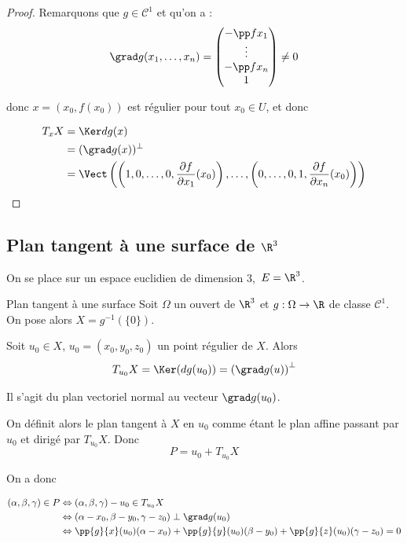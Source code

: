 \begin{proof}
    Remarquons que $g \in \mathscr C^1$ et qu'on a :
    $$\grad g(x_1, \dots, x_n) = \begin{pmatrix}
        - \pp f {x_1} \\
        \vdots \\
        - \pp f {x_n} \\
        1
    \end{pmatrix} \neq 0$$

    donc $x = (x_0, f(x_0))$ est régulier pour tout $x_0 \in U$, et donc 

    \begin{align}
        T_xX & = \Ker dg(x) \\
        & = (\grad g(x))^\perp \\
        & = \Vect \left( \left(1, 0, \ldots, 0, \frac{\partial f}{\partial x_1}(x_0) \right), \ldots, \left(0, \ldots, 0, 1, \frac{\partial f}{\partial x_n}(x_0) \right) \right) 
    \end{align}
\end{proof}


\subsection{Plan tangent à une surface de \texorpdfstring{$\R^3$}{R3}}

On se place sur un espace euclidien de dimension $3$, $\,E = \R^3$.


\begin{definition}{Plan tangent à une surface}{}
    Soit $\Omega$ un ouvert de $\R^3$ et $g : \Omega \to \R$ de classe $\mathscr C^1$.
    On pose alors $X = g^{-1}(\{0\})$.

    Soit $u_0 \in X$, $u_0 = (x_0, y_0, z_0)$ un point régulier de $X$. Alors 
    $$T_{u_0}X = \Ker(dg(u_0)) = \left( \grad g(u) \right)^\perp$$

    Il s'agit du plan vectoriel normal au vecteur $\grad g(u_0)$.

    \avspace 

    On définit alors le plan tangent à $X$ en $u_0$ comme étant le plan affine passant par 
    $u_0$ et dirigé par $T_{u_0}X$. Donc 
    $$P = u_0 + T_{u_0}X$$
\end{definition}

On a donc 

\begin{align}
    (\alpha, \beta, \gamma) \in P & \Leftrightarrow (\alpha, \beta, \gamma) - u_0 \in T_{u_0}X \\
    & \Leftrightarrow (\alpha - x_0, \beta - y_0, \gamma - z_0) \perp \grad g(u_0) \\
    & \Leftrightarrow \pp{g}{x}(u_0) (\alpha - x_0) + \pp{g}{y}(u_0) (\beta - y_0) + \pp{g}{z}(u_0) (\gamma - z_0) = 0
\end{align}


